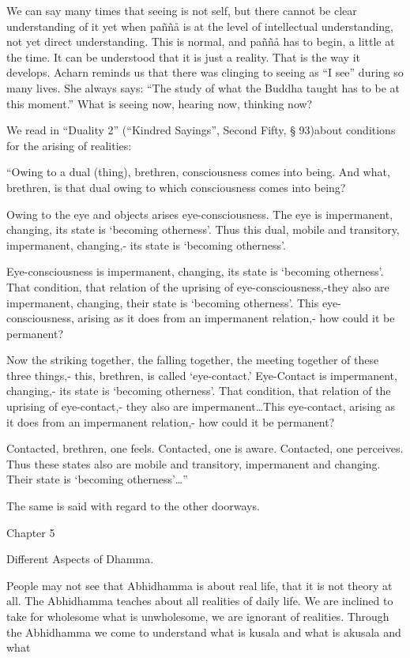 \documentclass[10pt,a4paper,final]{article}
\begin{document}
We can say many times
that seeing is not self, but there cannot be clear understanding of it
yet when paññå is at the
level of intellectual understanding, not yet direct understanding. This
is normal, and paññå has to
begin, a little at the time. It can be understood that it is just a
reality. That is the way it develops. Acharn reminds us that there was
clinging to seeing as ``I see''
during so many lives. She always says:
``The study of what the
Buddha taught has to be at this
moment.'' What is seeing
now, hearing now, thinking now?

We read in ``Duality 2'' (``Kindred
Sayings'', Second Fifty, § 93)about conditions for the arising of
realities:

``Owing to a dual (thing), brethren,
consciousness comes into being. And what, brethren, is that dual owing
to which consciousness comes into
being?

Owing to the eye and objects arises
eye-consciousness. The eye is impermanent, changing, its state is
`becoming otherness'. Thus this dual, mobile and transitory,
impermanent, changing,- its state is
`becoming otherness'.

Eye-consciousness
is impermanent, changing, its state is
`becoming otherness'. That
condition, that relation of the uprising of eye-consciousness,-they also
are impermanent, changing, their state is
`becoming otherness'. This
eye-consciousness, arising as it does from an impermanent relation,- how
could it be permanent?

Now the striking together, the falling
together, the meeting together of these three things,- this, brethren,
is called `eye-contact.' Eye-Contact is impermanent, changing,- its
state is `becoming
otherness'. That condition, that relation of the uprising of
eye-contact,- they also are impermanent\ldots This eye-contact,
arising as it does from an impermanent relation,- how could it be
permanent?

Contacted, brethren, one feels. Contacted,
one is aware. Contacted, one perceives. Thus these states also are
mobile and transitory, impermanent and changing. Their state is
`becoming
otherness'\ldots''

The same is said with regard to the other
doorways. 



Chapter 5

Different Aspects of Dhamma.

People may
not see that Abhidhamma is about real life, that it is not theory at
all. The Abhidhamma teaches about all realities of daily
life. We are inclined to take for wholesome what is unwholesome, we are
ignorant of realities. Through the Abhidhamma we come to understand what
is kusala and what is akusala and what 
\end{document}
